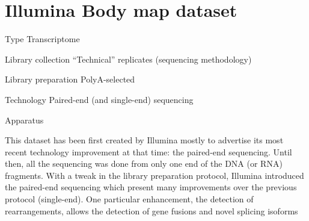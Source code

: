 \chapter{Illumina Body map dataset}
\label{ch:IBMData}

\begin{eqlist}
    \item[Type] Transcriptome
    \item[Library collection] ``Technical'' replicates (sequencing methodology)
    \item[Library preparation] PolyA-selected
    \item[Technology] Paired-end (and single-end) sequencing
    \item[Apparatus]
\end{eqlist}

This dataset has been first created by Illumina mostly to advertise its most
recent technology improvement at that time: the paired-end sequencing.  Until
then, all the sequencing was done from only one end of the \gls{DNA} (or
\gls{RNA}) fragments. With a tweak in the library preparation protocol, Illumina
introduced the paired-end sequencing which present many improvements over the
previous protocol (single-end). One particular enhancement, the detection of
rearrangements, allows the detection of gene fusions and novel splicing isoforms
